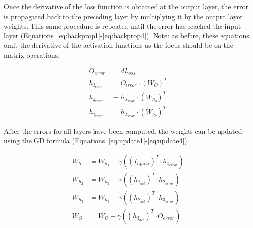 Once the derivative of the loss function is obtained at the output layer, the
error is propagated back to the preceding layer by multiplying it by the output
layer weights. This same procedure is repeated until the error has reached the
input layer (Equations~\ref{eq:backprop1}-\ref{eq:backprop4}). Note: as before,
these equations omit the derivative of the activation functions as the focus
should be on the matrix operations. 

\begin{align}
    O_{\textit{error}} &= dL_\textit{oss} \label{eq:backprop1}\\
        h_{3_{\textit{error}}} &= O_{\textit{error}} \cdot (W_{O})^T \label{eq:backprop2}\\
        h_{2_{\textit{error}}} &= h_{3_{\textit{error}}} \cdot (W_{h_3})^T \label{eq:backprop3}\\
        h_{1_{\textit{error}}} &= h_{2_{\textit{error}}} \cdot (W_{h_2})^T \label{eq:backprop4}
\end{align}

After the errors for all layers have been computed, the weights can be updated
using the GD formula (Equations~\ref{eq:update1}-\ref{eq:update4}).

\begin{align}
    W_{h_1} &= W_{h_1} - \gamma ((I_\textit{nputs})^T \cdot h_{1_{\textit{error}}}) \label{eq:update1} \\
    W_{h_2} &= W_{h_2} - \gamma ((h_{1_{\textit{act}}})^T \cdot h_{2_{\textit{error}}}) \label{eq:update2} \\
    W_{h_3} &= W_{h_3} - \gamma ((h_{2_{\textit{act}}})^T \cdot h_{3_{\textit{error}}}) \label{eq:update3} \\
    W_{O} &= W_{O} - \gamma ((h_{3_{\textit{act}}})^T \cdot O_{\textit{error}}) \label{eq:update4}
\end{align}

